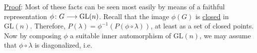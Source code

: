 \uline{Proof}: Most of these facts can be seen most easily by means of a faithful representation $\phi\colon G\longrightarrow\mathrm{GL}(n)$. Recall that the image $\phi(G)$ is \uline{closed} in $\mathrm{GL}(n)$. Therefore, $P(\lambda)=\phi^{-1}(P(\phi\circ\lambda))$, at least as a set of closed points. Now by composing $\phi$   a suitable inner automorphism of $\mathrm{GL}(n)$, we may assume that $\phi\circ\lambda$ is diagonalized, i.e.
